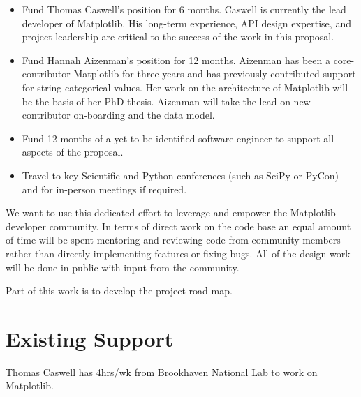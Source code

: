 \documentclass[11pt]{article}  %
\begin{document}
\begin{itemize}

\item Fund Thomas Caswell's position for 6 months.  Caswell is
  currently the lead developer of Matplotlib.  His long-term
  experience, API design expertise, and project leadership are critical
  to the success of the work in this proposal.
\item Fund Hannah Aizenman's position for 12 months.  Aizenman has
  been a core-contributor Matplotlib for three years and has
  previously contributed support for string-categorical values.  Her
  work on the architecture of Matplotlib will be the basis of her PhD
  thesis.  Aizenman will take the lead on new-contributor on-boarding
  and the data model.
\item Fund 12 months of a yet-to-be identified software engineer to
  support all aspects of the proposal.
\item Travel to key Scientific and Python conferences (such as SciPy
  or PyCon) and for in-person meetings if required.
\end{itemize}

We want to use this dedicated effort to leverage and empower the
Matplotlib developer community.  In terms of direct work on the code
base an equal amount of time will be spent mentoring and reviewing
code from community members rather than directly implementing features
or fixing bugs.  All of the design work will be done in public with
input from the community.

Part of this work is to develop the project road-map.


\section{Existing Support}

Thomas Caswell has 4hrs/wk from Brookhaven National Lab to work on Matplotlib.


\clearpage

\end{document}
